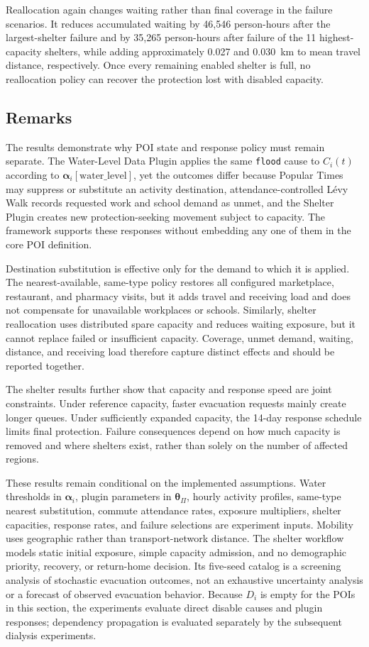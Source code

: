 Reallocation again changes waiting rather than final coverage in the failure scenarios. It reduces accumulated waiting by 46,546 person-hours after the largest-shelter failure and by 35,265 person-hours after failure of the 11 highest-capacity shelters, while adding approximately 0.027 and 0.030~km to mean travel distance, respectively. Once every remaining enabled shelter is full, no reallocation policy can recover the protection lost with disabled capacity.

\subsection{Remarks}

The results demonstrate why POI state and response policy must remain separate. The Water-Level Data Plugin applies the same \texttt{flood} cause to $C_i(t)$ according to $\bm{\alpha}_i[\mathrm{water\_level}]$, yet the outcomes differ because Popular Times may suppress or substitute an activity destination, attendance-controlled L\'evy Walk records requested work and school demand as unmet, and the Shelter Plugin creates new protection-seeking movement subject to capacity. The framework supports these responses without embedding any one of them in the core POI definition.

Destination substitution is effective only for the demand to which it is applied. The nearest-available, same-type policy restores all configured marketplace, restaurant, and pharmacy visits, but it adds travel and receiving load and does not compensate for unavailable workplaces or schools. Similarly, shelter reallocation uses distributed spare capacity and reduces waiting exposure, but it cannot replace failed or insufficient capacity. Coverage, unmet demand, waiting, distance, and receiving load therefore capture distinct effects and should be reported together.

The shelter results further show that capacity and response speed are joint constraints. Under reference capacity, faster evacuation requests mainly create longer queues. Under sufficiently expanded capacity, the 14-day response schedule limits final protection. Failure consequences depend on how much capacity is removed and where shelters exist, rather than solely on the number of affected regions.

These results remain conditional on the implemented assumptions. Water thresholds in $\bm{\alpha}_i$, plugin parameters in $\bm{\theta}_{\Pi}$, hourly activity profiles, same-type nearest substitution, commute attendance rates, exposure multipliers, shelter capacities, response rates, and failure selections are experiment inputs. Mobility uses geographic rather than transport-network distance. The shelter workflow models static initial exposure, simple capacity admission, and no demographic priority, recovery, or return-home decision. Its five-seed catalog is a screening analysis of stochastic evacuation outcomes, not an exhaustive uncertainty analysis or a forecast of observed evacuation behavior. Because $D_i$ is empty for the POIs in this section, the experiments evaluate direct disable causes and plugin responses; dependency propagation is evaluated separately by the subsequent dialysis experiments.
